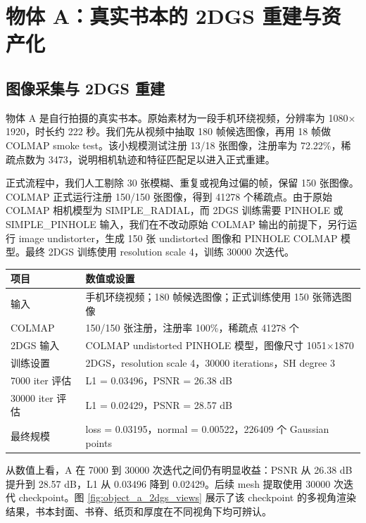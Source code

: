 \documentclass[UTF8,10pt,a4paper]{ctexart}
\let\latexcenter\center
\let\endlatexcenter\endcenter
\renewenvironment{center}{%
  \setlength{\topsep}{0.35em plus 0.08em minus 0.08em}%
  \setlength{\partopsep}{0pt}%
  \latexcenter
}{\endlatexcenter}
\begin{document}
\section{物体 A：真实书本的 2DGS 重建与资产化}

\subsection{图像采集与 2DGS 重建}

物体 A 是自行拍摄的真实书本。原始素材为一段手机环绕视频，分辨率为 1080$\times$1920，时长约 222 秒。我们先从视频中抽取 180 帧候选图像，再用 18 帧做 COLMAP smoke test。该小规模测试注册 13/18 张图像，注册率为 72.22\%，稀疏点数为 3473，说明相机轨迹和特征匹配足以进入正式重建。

正式流程中，我们人工剔除 30 张模糊、重复或视角过偏的帧，保留 150 张图像。COLMAP 正式运行注册 150/150 张图像，得到 41278 个稀疏点。由于原始 COLMAP 相机模型为 SIMPLE\_RADIAL，而 2DGS 训练需要 PINHOLE 或 SIMPLE\_PINHOLE 输入，我们在不改动原始 COLMAP 输出的前提下，另行运行 image undistorter，生成 150 张 undistorted 图像和 PINHOLE COLMAP 模型。最终 2DGS 训练使用 resolution scale 4，训练 30000 次迭代。

\begin{center}
\label{tab:object_a_recon_metrics}
\small
\begin{tabularx}{\textwidth}{p{} X}
\toprule
项目 & 数值或设置 \\
\midrule
输入 & 手机环绕视频；180 帧候选图像；正式训练使用 150 张筛选图像 \\
COLMAP & 150/150 张注册，注册率 100\%，稀疏点 41278 个 \\
2DGS 输入 & COLMAP undistorted PINHOLE 模型，图像尺寸 1051$\times$1870 \\
训练设置 & 2DGS，resolution scale 4，30000 iterations，SH degree 3 \\
7000 iter 评估 & L1 = 0.03496，PSNR = 26.38 dB \\
30000 iter 评估 & L1 = 0.02429，PSNR = 28.57 dB \\
最终规模 & loss = 0.03195，normal = 0.00522，226409 个 Gaussian points \\
\bottomrule
\end{tabularx}
\end{center}

从数值上看，A 在 7000 到 30000 次迭代之间仍有明显收益：PSNR 从 26.38 dB 提升到 28.57 dB，L1 从 0.03496 降到 0.02429。后续 mesh 提取使用 30000 次迭代 checkpoint。图 \ref{fig:object_a_2dgs_views} 展示了该 checkpoint 的多视角渲染结果，书本封面、书脊、纸页和厚度在不同视角下均可辨认。
\end{document}
